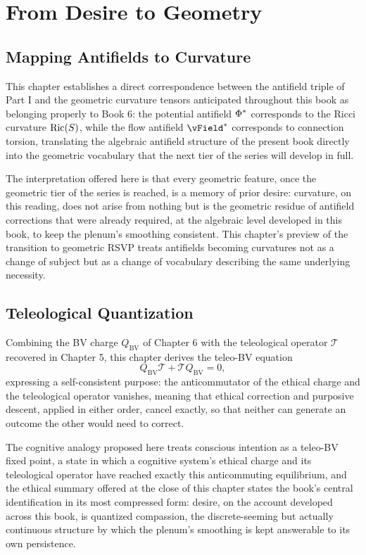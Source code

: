 \part{From Desire to Geometry}

\chapter{Mapping Antifields to Curvature}

This chapter establishes a direct correspondence between the antifield triple of Part I and the geometric curvature tensors anticipated throughout this book as belonging properly to Book 6: the potential antifield $\Phi^{*}$ corresponds to the Ricci curvature $\mathrm{Ric}(S)$, while the flow antifield $\vField^{*}$ corresponds to connection torsion, translating the algebraic antifield structure of the present book directly into the geometric vocabulary that the next tier of the series will develop in full.

The interpretation offered here is that every geometric feature, once the geometric tier of the series is reached, is a memory of prior desire: curvature, on this reading, does not arise from nothing but is the geometric residue of antifield corrections that were already required, at the algebraic level developed in this book, to keep the plenum's smoothing consistent. This chapter's preview of the transition to geometric RSVP treats antifields becoming curvatures not as a change of subject but as a change of vocabulary describing the same underlying necessity.

\chapter{Teleological Quantization}

Combining the BV charge $Q_{\text{BV}}$ of Chapter 6 with the teleological operator $\mathcal{T}$ recovered in Chapter 5, this chapter derives the teleo-BV equation
\[
Q_{\text{BV}} \mathcal{T} + \mathcal{T} Q_{\text{BV}} = 0,
\]
expressing a self-consistent purpose: the anticommutator of the ethical charge and the teleological operator vanishes, meaning that ethical correction and purposive descent, applied in either order, cancel exactly, so that neither can generate an outcome the other would need to correct.

The cognitive analogy proposed here treats conscious intention as a teleo-BV fixed point, a state in which a cognitive system's ethical charge and its teleological operator have reached exactly this anticommuting equilibrium, and the ethical summary offered at the close of this chapter states the book's central identification in its most compressed form: desire, on the account developed across this book, is quantized compassion, the discrete-seeming but actually continuous structure by which the plenum's smoothing is kept answerable to its own persistence.

